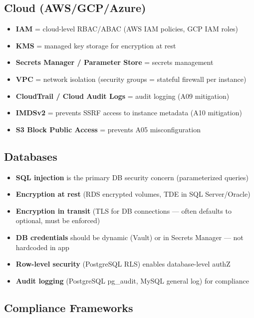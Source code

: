 \documentclass[11pt]{article}
\providecommand{\tightlist}{\setlength{\itemsep}{1pt}\setlength{\parskip}{0pt}}
\begin{document}
\subsection{Cloud (AWS/GCP/Azure)}\label{cloud-awsgcpazure}

\begin{itemize}
\tightlist
\item
  \textbf{IAM} = cloud-level RBAC/ABAC (AWS IAM policies, GCP IAM roles)
\item
  \textbf{KMS} = managed key storage for encryption at rest
\item
  \textbf{Secrets Manager / Parameter Store} = secrets management
\item
  \textbf{VPC} = network isolation (security groups = stateful firewall per instance)
\item
  \textbf{CloudTrail / Cloud Audit Logs} = audit logging (A09 mitigation)
\item
  \textbf{IMDSv2} = prevents SSRF access to instance metadata (A10 mitigation)
\item
  \textbf{S3 Block Public Access} = prevents A05 misconfiguration
\end{itemize}

\subsection{Databases}\label{databases}

\begin{itemize}
\tightlist
\item
  \textbf{SQL injection} is the primary DB security concern (parameterized queries)
\item
  \textbf{Encryption at rest} (RDS encrypted volumes, TDE in SQL Server/Oracle)
\item
  \textbf{Encryption in transit} (TLS for DB connections --- often defaults to optional, must be enforced)
\item
  \textbf{DB credentials} should be dynamic (Vault) or in Secrets Manager --- not hardcoded in app
\item
  \textbf{Row-level security} (PostgreSQL RLS) enables database-level authZ
\item
  \textbf{Audit logging} (PostgreSQL pg\_audit, MySQL general log) for compliance
\end{itemize}

\subsection{Compliance Frameworks}\label{compliance-frameworks}
\end{document}
